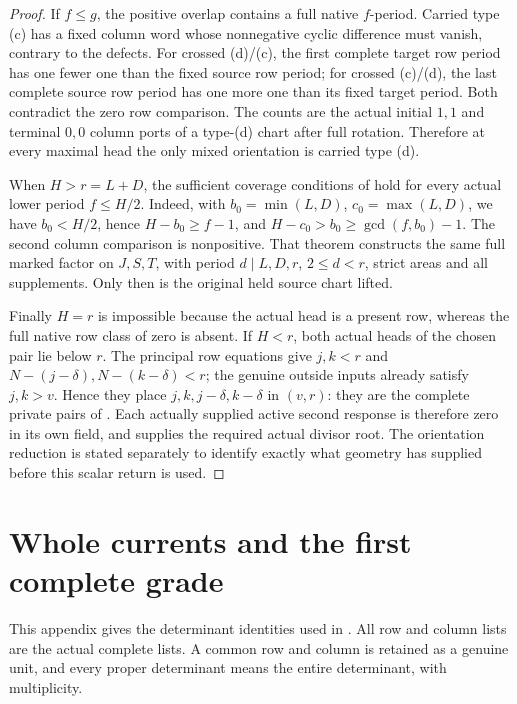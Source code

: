 \documentclass[11pt,a4paper]{amsart}
\numberwithin{equation}{section}
\theoremstyle{plain}
\theoremstyle{definition}
\begin{document}
\begin{proof}
If \(f\le g\), the positive overlap contains a full native
\(f\)-period.  Carried type (c) has a fixed column word whose
nonnegative cyclic difference must vanish, contrary to the defects.
For crossed (d)/(c), the first complete target row period has one fewer
one than the fixed source row period; for crossed (c)/(d), the last
complete source row period has one more one than its fixed target
period.  Both contradict the zero row comparison.  The counts are the
actual initial \(1,1\) and terminal \(0,0\) column ports of a
type-(d) chart after full rotation.  Therefore at every maximal head the
only mixed orientation is carried type (d).

When \(H>r=L+D\), the sufficient coverage conditions of
 hold for every actual lower period \(f\le H/2\).
Indeed, with \(b_0=\min(L,D)\), \(c_0=\max(L,D)\),
we have \(b_0< H/2\), hence \(H-b_0\ge f-1\), and
\(H-c_0>b_0\ge\gcd(f,b_0)-1\).  The second column comparison
is nonpositive.  That theorem constructs the same full marked factor on
\(J,S,T\), with period \(d\mid L,D,r\), \(2\le d<r\),
strict areas and all supplements.  Only then is the original held source
chart lifted.

Finally \(H=r\) is impossible because the actual head is a present
row, whereas the full native row class of zero is absent.  If \(H<r\),
both actual heads of the chosen pair lie below \(r\).  The principal
row equations give \(j,k<r\) and
\(N-(j-\delta),N-(k-\delta)<r\); the genuine outside inputs
already satisfy \(j,k>v\).  Hence they place
\(j,k,j-\delta,k-\delta\) in \((v,r)\): they are the complete
private pairs of .  Each actually supplied active
second response is therefore zero in its own field, and
 supplies the required actual divisor
root.  The orientation reduction is stated separately to identify exactly
what geometry has supplied before this scalar return is used.
\end{proof}
\section{Whole currents and the first complete grade}\label{app:physical}

This appendix gives the determinant identities used in
.  All row and column lists are the actual complete
lists.  A common row and column is retained as a genuine unit, and every
proper determinant means the entire determinant, with multiplicity.
\end{document}

